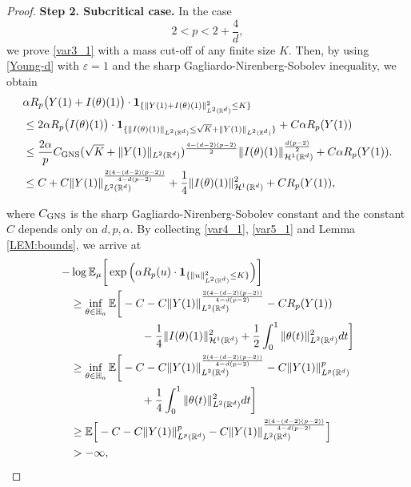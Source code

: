 \documentclass[%
11pt,  reqno]{amsart}
\theoremstyle{remarkstyle}
\newcommand{\1}{\hspace{0.2mm}\text{I}\hspace{0.2mm}}
\newcommand{\noi}{\noindent}
\newcommand{\R}{\mathbb{R}}
\newcommand{\E}{\mathbb{E}}
\newcommand{\al}{\alpha}
\newcommand{\eps}{\varepsilon}
\newcommand{\ind}{\mathbf 1}
\numberwithin{equation}{section}
\numberwithin{theorem}{section}
\begin{document}
\begin{proof}
		\medskip
		
		\noi
		{\bf Step 2. Subcritical case.}
		In the case
		$$2 < p <  2+\frac4d,$$
		we prove \eqref{var3_1} 
		with a mass cut-off of any finite size $K$.
		Then, by using \eqref{Young-d} with $\eps =1$ and the sharp Gagliardo-Nirenberg-Sobolev inequality, we obtain
		\begin{align}
			\label{var5_1}
			\begin{split}
				& \al R_p \big(Y(1) +I(\theta)(1)\big) 
				\cdot  \ind_{\{\|Y(1) +I(\theta)(1)\|^2_{L^2(\R^d)}\le K\}} \\
				& \le 2 \al R_p \big( I(\theta)(1)\big) 
				\cdot  \ind_{\{\|I(\theta)(1)\|_{L^2(\R^d)}\le \sqrt{K}+\| Y(1) \|_{L^2 (\R^d)} \}}   + C \al R_p(Y(1)) \\
				& \le \frac{2\al}p C_{\textup{GNS}} (\sqrt{K}+\| Y(1) \|_{L^2 (\R^d)})^{\frac{4-(d-2)(p-2)}{2}}  \| I(\theta)(1)\|^{\frac{d(p-2)}{2}}_{\mathcal H^1 (\R^d)}  + C \al R_p(Y(1)). \\
				& \le  C  + C \| Y(1)\|_{L^2 (\R^d)}^{\frac{2(4-(d-2)(p-2))}{4-d(p-2)}} 
				+ \frac14 \| I(\theta)(1)\|_{\mathcal H^1 (\R^d)}^2 
				+ C R_p(Y(1)),
			\end{split}
		\end{align}
		
		\noi
		where $C_{\textup{GNS}}$ is the sharp Gagliardo-Nirenberg-Sobolev constant and the constant $C$ depends only on $d,p,\al$. 
		By collecting \eqref{var4_1}, \eqref{var5_1} and Lemma \ref{LEM:bounds},
		we arrive at
		\begin{align*}
			\begin{split}
				- & \log \E_\mu \bigg[ \exp \Big(\al R_p(u) \cdot  \ind_{\{\|u\|^2_{L^2(\R^d)}\le K\}} \Big)\bigg] \\
				& \ge \inf_{\theta \in \mathbb{H}_a} \E \bigg[ - C - C \| Y(1)\|_{L^2 (\R^d)}^{\frac{2(4-(d-2)(p-2))}{4-d(p-2)}}  
				- C R_p(Y(1)) \\
				& \hphantom{XXXXXXX} 
				- \frac14 \| I(\theta)(1)\|_{\mathcal H^1 (\R^d)}^2 + \frac12 \int_0^1 
				\| \theta (t) \|_{L^2(\R^d)}^2 dt \bigg]\\
				& \ge \inf_{\theta \in \mathbb{H}_a} \E \bigg[ - C - C \| Y(1)\|_{L^2 (\R^d)}^{\frac{2(4-(d-2)(p-2))}{4-d(p-2)}}   
				- C \|Y(1)\|_{L^p(\R^d)}^p \\
				& \hphantom{XXXXXXX} 
				+ \frac14  \int_0^1 
				\| \theta (t) \|_{L^2(\R^d)}^2 dt \bigg]\\
				& \ge  \E \Big[  - C - C \|Y(1)\|_{L^p(\R^d)}^p  - C \| Y(1)\|_{L^2 (\R^d)}^{\frac{2(4-(d-2)(p-2))}{4-d(p-2)}}
				\Big] \\
				& > -\infty,
			\end{split}
		\end{align*}
		

\end{proof}
\end{document}
